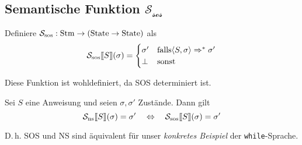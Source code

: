 \subsection{Semantische Funktion $\mathcal{S_{\text{sos}}}$}

\begin{definition}
    Definiere $\mathcal{S_{\text{sos}}}: \operatorname{Stm} \to (\operatorname{State} \to \operatorname{State})$ als
    \[
        \mathcal{S_{\text{sos}}}\mathrm{[}\kern-.14em\mathrm{[} S \mathrm{]}\kern-.14em\mathrm{]}(\sigma) = \begin{cases}
            \sigma' & \text{falls} \langle S, \sigma \rangle \Rightarrow^* \sigma' \\
            \bot & \text{sonst}
        \end{cases}
    \]

    Diese Funktion ist wohldefiniert, da SOS determiniert ist.
\end{definition}

\begin{theorem}
    Sei $S$ eine Anweisung und seien $\sigma, \sigma'$ Zustände. Dann gilt
    \[
        \mathcal{S_{\text{ns}}}\mathrm{[}\kern-.14em\mathrm{[} S \mathrm{]}\kern-.14em\mathrm{]}(\sigma) = \sigma'
        \quad\Leftrightarrow\quad
        \mathcal{S_{\text{sos}}}\mathrm{[}\kern-.14em\mathrm{[} S \mathrm{]}\kern-.14em\mathrm{]}(\sigma) = \sigma'
    \]

    D.\,h. SOS und NS sind äquivalent für unser \emph{konkretes Beispiel} der \texttt{while}-Sprache.
\end{theorem}

